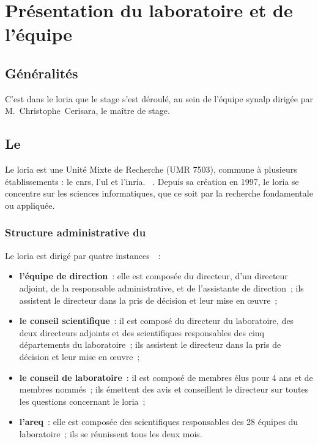 \chapter{Présentation du laboratoire et de l'équipe}
\section{Généralités}
C'est dans le \gls{loria} que le stage s'est déroulé, au sein de l'équipe \gls{synalp} dirigée par M.~Christophe~Cerisara, le maître de stage.

\section{Le }
Le \gls{loria} \og est une Unité Mixte de Recherche (UMR 7503), commune à plusieurs établissements : le \gls{cnrs}, l’\gls{ul} et l'\gls{inria}. \fg{}~\autocite{about_loria}.
Depuis sa création en 1997, le \gls{loria} se concentre sur les sciences informatiques, que ce soit par la recherche fondamentale ou appliquée.

\subsection{Structure administrative du }
Le \gls{loria} est dirigé par quatre instances~\autocite{organisation_loria}~:
\begin{itemize}
	\item \textbf{l'équipe de direction}~: elle est composée du directeur, d'un directeur adjoint, de la responsable administrative, et de l'assistante de direction~; ils assistent le directeur dans la pris de décision et leur mise en œuvre~;
	\item \textbf{le conseil scientifique}~: il est composé du directeur du laboratoire, des deux directeurs adjoints et des scientifiques responsables des cinq départements du laboratoire~; ils assistent le directeur dans la pris de décision et leur mise en œuvre~;
	\item \textbf{le conseil de laboratoire}~: il est composé de membres élus pour 4 ans et de membres nommés~; ils émettent des avis et conseillent le directeur sur toutes les questions concernant le \gls{loria}~;
	\item \textbf{l'\gls{areq}}~: elle est composée des scientifiques responsables des 28 équipes du laboratoire~; ils se réunissent tous les deux mois.
\end{itemize}
\vspace{1em}

